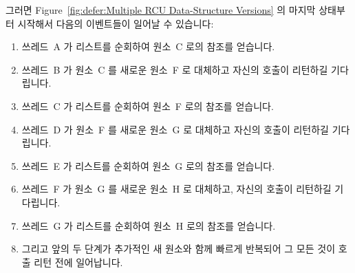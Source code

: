 {{	그러면
	Figure~\ref{fig:defer:Multiple RCU Data-Structure Versions}
	의 마지막 상태부터 시작해서 다음의 이벤트들이 일어날 수 있습니다:

	\begin{enumerate}
	\item	쓰레드~A 가 리스트를 순회하여 원소~C 로의 참조를 얻습니다.
	\item	쓰레드~B 가 원소~C 를 새로운 원소~F 로 대체하고
		자신의  호출이 리턴하길 기다립니다.
	\item	쓰레드~C 가 리스트를 순회하여 원소~F 로의 참조를 얻습니다.
	\item	쓰레드~D 가 원소~F 를 새로운 원소~G 로 대체하고 자신의
		 호출이 리턴하길 기다립니다.
	\item	쓰레드~E 가 리스트를 순회하여 원소~G 로의 참조를 얻습니다.
	\item	쓰레드~F 가 원소~G 를 새로운 원소~H 로 대체하고, 자신의
		 호출이 리턴하길 기다립니다.
	\item	쓰레드~G 가 리스트를 순회하여 원소~H 로의 참조를 얻습니다.
	\item	그리고 앞의 두 단계가 추가적인 새 원소와 함께 빠르게 반복되어
		그 모든 것이  호출 리턴 전에 일어납니다.

	\iffalse


\end{enumerate}}}
